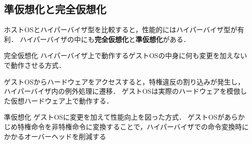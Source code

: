 \subsection{準仮想化と完全仮想化}
\begin{frame}[t]{\ftitle}
    ホストOSとハイパーバイザ型を比較すると，性能的にはハイパーバイザ型が有利．
    ハイパーバイザの中にも\textbf{完全仮想化}と\textbf{準仮想化}がある．
    \begin{block}{完全仮想化}
        ハイパーバイザ上で動作するゲストOSの中身に何も変更を加えないで動作させる方式．
    \end{block}
    ゲストOSからハードウェアをアクセスすると，特権違反の割り込みが発生し，ハイパーバイザ内の例外処理に遷移．
    ゲストOSは実際のハードウェアを模倣した仮想ハードウェア上で動作する．
\end{frame}
\begin{frame}[t]{\ftitle}
    \begin{block}{準仮想化}
        ゲストOSに変更を加えて性能向上を図った方式．
        ゲストOSがあらかじめ特権命令を非特権命令に変換することで，ハイパーバイザでの命令変換時にかかるオーバーヘッドを削減する
    \end{block}
\end{frame}
